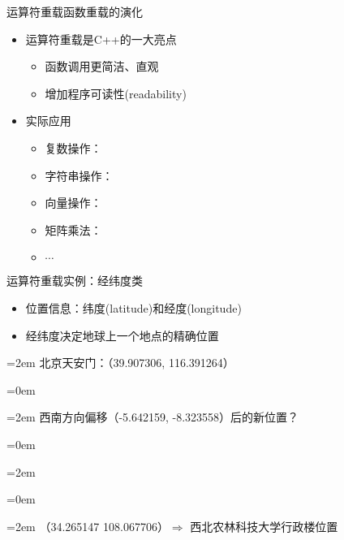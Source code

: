 \begin{frame}[t, fragile]{运算符重载}{函数重载的演化}%
  \stretchon
  \begin{itemize}
  \item 运算符重载是C++的一大亮点
    \begin{itemize}
    \item 函数调用更简洁、直观
    \item 增加程序可读性(readability)
    \end{itemize}
  \item 实际应用
    \begin{itemize}
    \item 复数操作：
    \item 字符串操作：
    \item 向量操作：
    \item 矩阵乘法：
    \item $\cdots$
    \end{itemize}
  \end{itemize}
  \stretchoff
\end{frame}

\begin{frame}[t, fragile]{运算符重载}{实例：经纬度类}%
  \begin{spacing}{1.5}
  \begin{itemize}
  \item 位置信息：纬度(latitude)和经度(longitude)
  \item 经纬度决定地球上一个地点的精确位置    
  \end{itemize}
  \begin{center}
    \begin{boxedminipage}{0.95\linewidth}
      \footnotesize      

      \parindent=2em 北京天安门：（39.907306, 116.391264）

      \parindent=0em 

      \parindent=2em 西南方向偏移（-5.642159, -8.323558）后的新位置？

      \parindent=0em 

      \parindent=2em \quad{}

      \parindent=0em 

      \parindent=2em    （34.265147 108.067706）$\Rightarrow$  西北农林科技大学行政楼位置
    \end{boxedminipage}
  \end{center}
  \end{spacing}
\end{frame}

